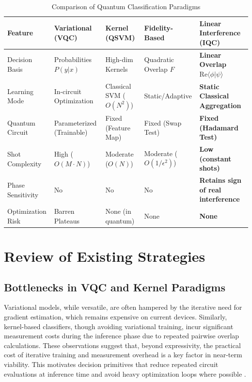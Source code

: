 \documentclass[conference]{IEEEtran}
\begin{document}
\begin{table}[t]
\centering
\caption{Comparison of Quantum Classification Paradigms}
\label{tab:comparison}
\begin{tabular}{@{}lllll@{}}
\toprule
Feature & Variational (VQC) & Kernel (QSVM) & Fidelity-Based & \textbf{Linear Interference (IQC)} \\ \midrule
Decision Basis & Probabilities $P(y|x)$ & High-dim Kernels & Quadratic Overlap $F$ & \textbf{Linear Overlap $\mathrm{Re}\langle \phi|\psi \rangle$} \\
Learning Mode & In-circuit Optimization & Classical SVM ($O(N^2)$) & Static/Adaptive & \textbf{Static Classical Aggregation} \\
Quantum Circuit & Parameterized (Trainable) & Fixed (Feature Map) & Fixed (Swap Test) & \textbf{Fixed (Hadamard Test)} \\
Shot Complexity & High ($O(M \cdot N)$) & Moderate ($O(N)$) & Moderate ($O(1/\epsilon^2)$) & \textbf{Low (constant shots)} \\
Phase Sensitivity & No & No & No & \textbf{Retains sign of real interference} \\
Optimization Risk & Barren Plateaus & None (in quantum) & None & \textbf{None} \\ \bottomrule
\end{tabular}
\end{table}

\section{Review of Existing Strategies}

\subsection{Bottlenecks in VQC and Kernel Paradigms}
Variational models, while versatile, are often hampered by the iterative need for gradient estimation, which remains expensive on current devices. Similarly, kernel-based classifiers, though avoiding variational training, incur significant measurement costs during the inference phase due to repeated pairwise overlap calculations.
These observations suggest that, beyond expressivity, the practical cost of iterative training and measurement overhead is a key factor in near-term viability. This motivates decision primitives that reduce repeated circuit evaluations at inference time and avoid heavy optimization loops where possible \cite{benedetti2019parameterized,mcclean2018barren}.
\end{document}
